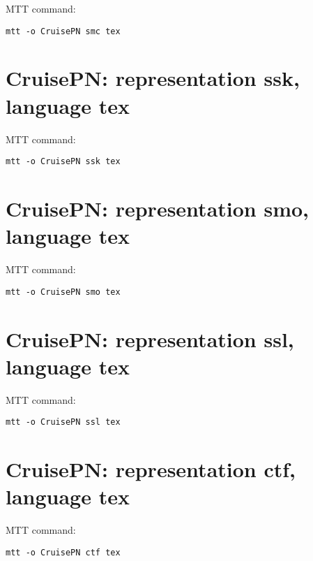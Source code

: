 MTT command:
\begin{verbatim}
mtt -o CruisePN smc tex 
\end{verbatim}
  


\section{\textbf{CruisePN}: representation \textbf{ssk}, language \textbf{tex}}
\label{sec:CruisePN_ssk.tex}


MTT command:
\begin{verbatim}
mtt -o CruisePN ssk tex 
\end{verbatim}
  


\section{\textbf{CruisePN}: representation \textbf{smo}, language \textbf{tex}}
\label{sec:CruisePN_smo.tex}


MTT command:
\begin{verbatim}
mtt -o CruisePN smo tex 
\end{verbatim}
  


\section{\textbf{CruisePN}: representation \textbf{ssl}, language \textbf{tex}}
\label{sec:CruisePN_ssl.tex}


MTT command:
\begin{verbatim}
mtt -o CruisePN ssl tex 
\end{verbatim}
  


\section{\textbf{CruisePN}: representation \textbf{ctf}, language \textbf{tex}}
\label{sec:CruisePN_ctf.tex}


MTT command:
\begin{verbatim}
mtt -o CruisePN ctf tex 
\end{verbatim}
  
